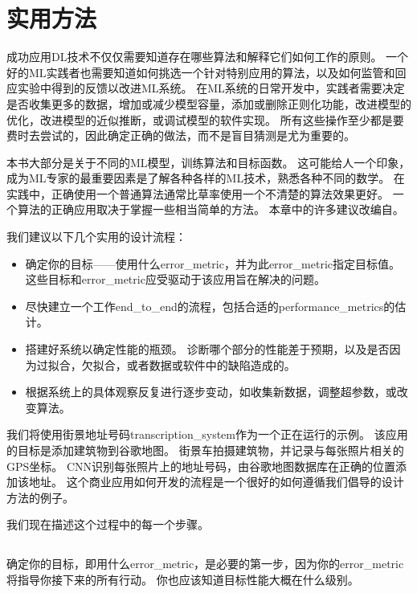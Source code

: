 \chapter{实用方法}
\label{chap:practical_methodology}
成功应用\gls{DL}技术不仅仅需要知道存在哪些算法和解释它们如何工作的原则。
一个好的\gls{ML}实践者也需要知道如何挑选一个针对特别应用的算法，以及如何监管和回应实验中得到的反馈以改进\gls{ML}系统。
在\gls{ML}系统的日常开发中，实践者需要决定是否收集更多的数据，增加或减少模型容量，添加或删除正则化功能，改进模型的优化，改进模型的近似推断，或调试模型的软件实现。
所有这些操作至少都是要费时去尝试的，因此确定正确的做法，而不是盲目猜测是尤为重要的。

本书大部分是关于不同的\gls{ML}模型，训练算法和目标函数。
这可能给人一个印象，成为\gls{ML}专家的最重要因素是了解各种各样的\gls{ML}技术，熟悉各种不同的数学。
在实践中，正确使用一个普通算法通常比草率使用一个不清楚的算法效果更好。
一个算法的正确应用取决于掌握一些相当简单的方法。
本章中的许多建议改编自\cite{ng-lecture-advice}。

我们建议以下几个实用的设计流程：
\begin{itemize}
\item 确定你的目标——使用什么\gls{error_metric}，并为此\gls{error_metric}指定目标值。
这些目标和\gls{error_metric}应受驱动于该应用旨在解决的问题。


\item 尽快建立一个工作\gls{end_to_end}的流程，包括合适的\gls{performance_metrics}的估计。

\item 搭建好系统以确定性能的瓶颈。
诊断哪个部分的性能差于预期，以及是否因为过拟合，欠拟合，或者数据或软件中的缺陷造成的。

\item 根据系统上的具体观察反复进行逐步变动，如收集新数据，调整超参数，或改变算法。
\end{itemize}

我们将使用街景地址号码\gls{transcription_system}\citep{Goodfellow+et+al-ICLR2014a}作为一个正在运行的示例。
该应用的目标是添加建筑物到谷歌地图。
街景车拍摄建筑物，并记录与每张照片相关的GPS坐标。
\gls{CNN}识别每张照片上的地址号码，由谷歌地图数据库在正确的位置添加该地址。
这个商业应用如何开发的流程是一个很好的如何遵循我们倡导的设计方法的例子。

我们现在描述这个过程中的每一个步骤。

\section{}
\label{sec:performance_metrics}
确定你的目标，即用什么\gls{error_metric}，是必要的第一步，因为你的\gls{error_metric}将指导你接下来的所有行动。
你也应该知道目标性能大概在什么级别。

